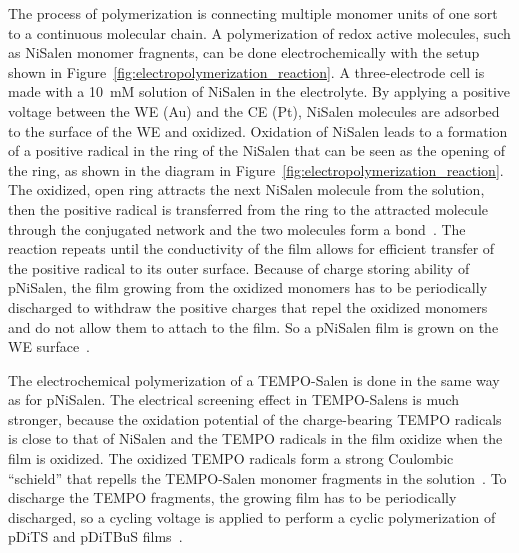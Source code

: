 The process of polymerization is connecting multiple monomer units of one sort to a continuous molecular chain. A polymerization of redox active molecules, such as NiSalen monomer fragnents, can be done electrochemically with the setup shown in Figure~\ref{fig:electropolymerization_reaction}. A three-electrode cell is made with a 10~mM solution of NiSalen in the electrolyte. By applying a positive voltage between the WE (Au) and the CE (Pt), NiSalen molecules are adsorbed to the surface of the WE and oxidized. Oxidation of NiSalen leads to a formation of a positive radical in the ring of the NiSalen that can be seen as the opening of the ring, as shown in the diagram in Figure~\ref{fig:electropolymerization_reaction}. The oxidized, open ring attracts the next NiSalen molecule from the solution, then the positive radical is transferred from the ring to the attracted molecule through the conjugated network and the two molecules form a bond~\cite{Koshika_2009}. The reaction repeats until the conductivity of the film allows for efficient transfer of the positive radical to its outer surface. Because of charge storing ability of pNiSalen, the film growing from the oxidized monomers has to be periodically discharged to withdraw the positive charges that repel the oxidized monomers and do not allow them to attach to the film. So a pNiSalen film is grown on the WE surface~\cite{Apraksin2021,Novozhilova_2009,Vereshchagin2020}.\\ 
\par
The electrochemical polymerization of a TEMPO-Salen is done in the same way as for pNiSalen. The electrical screening effect in TEMPO-Salens is much stronger, because the oxidation potential of the charge-bearing TEMPO radicals is close to that of NiSalen and the TEMPO radicals in the film oxidize when the film is oxidized. The oxidized TEMPO radicals form a strong Coulombic ``schield'' that repells the TEMPO-Salen monomer fragments in the solution~\cite{Vereshchagin2020}. To discharge the TEMPO fragments, the growing film has to be periodically discharged, so a cycling voltage is applied to perform a cyclic polymerization of pDiTS and pDiTBuS films~\cite{Vereshchagin2020,Kulikov2023}.\\

